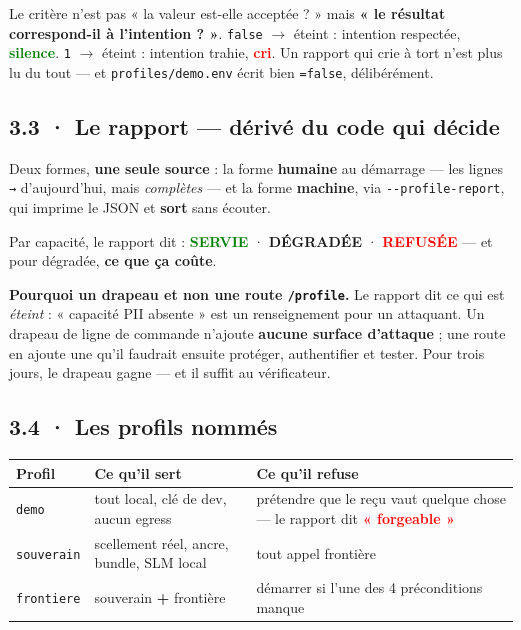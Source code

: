 \documentclass[10pt]{article}
\newcommand{\best}[1]{\textcolor{green}{\textbf{#1}}}
\newcommand{\pire}[1]{\textcolor{red}{\textbf{#1}}}
\newcommand{\code}[1]{\texttt{\small #1}}
\begin{document}
\begin{these}
Le critère n'est pas « la valeur est-elle acceptée ? » mais \textbf{« le résultat correspond-il à
l'intention ? »}. \code{false} $\rightarrow$ éteint : intention respectée, \best{silence}.
\code{1} $\rightarrow$ éteint : intention trahie, \pire{cri}. Un rapport qui crie à tort n'est plus
lu du tout --- et \code{profiles/demo.env} écrit bien \code{=false}, délibérément.
\end{these}

\subsection{3.3 · Le rapport --- dérivé du code qui décide}

Deux formes, \textbf{une seule source} : la forme \textbf{humaine} au démarrage --- les lignes
\code{→} d'aujourd'hui, mais \emph{complètes} --- et la forme \textbf{machine}, via
\code{-{}-profile-report}, qui imprime le JSON et \textbf{sort} sans écouter.

Par capacité, le rapport dit : \best{SERVIE} · \textcolor{amber}{\textbf{DÉGRADÉE}} ·
\pire{REFUSÉE} --- et pour dégradée, \textbf{ce que ça coûte}.

\begin{piste}
\textbf{Pourquoi un drapeau et non une route \code{/profile}.} Le rapport dit ce qui est \emph{éteint} :
« capacité PII absente » est un renseignement pour un attaquant. Un drapeau de ligne de commande
n'ajoute \textbf{aucune surface d'attaque} ; une route en ajoute une qu'il faudrait ensuite protéger,
authentifier et tester. Pour trois jours, le drapeau gagne --- et il suffit au vérificateur.
\end{piste}

\subsection{3.4 · Les profils nommés}

\begin{center}\small
\begin{tabular}{@{}>{\raggedright\arraybackslash}p{2.5cm} >{\raggedright\arraybackslash}p{6.4cm} >{\raggedright\arraybackslash}p{6.6cm}@{}}
\toprule
\textbf{Profil} & \textbf{Ce qu'il sert} & \textbf{Ce qu'il refuse} \\
\midrule
\code{demo} & tout local, clé de dev, aucun egress & prétendre que le reçu vaut quelque chose --- le rapport dit \pire{« forgeable »} \\
\code{souverain} & scellement réel, ancre, bundle, SLM local & tout appel frontière \\
\code{frontiere} & souverain \textbf{+} frontière & démarrer si l'une des 4 préconditions manque \\
\bottomrule
\end{tabular}
\end{center}
\end{document}
